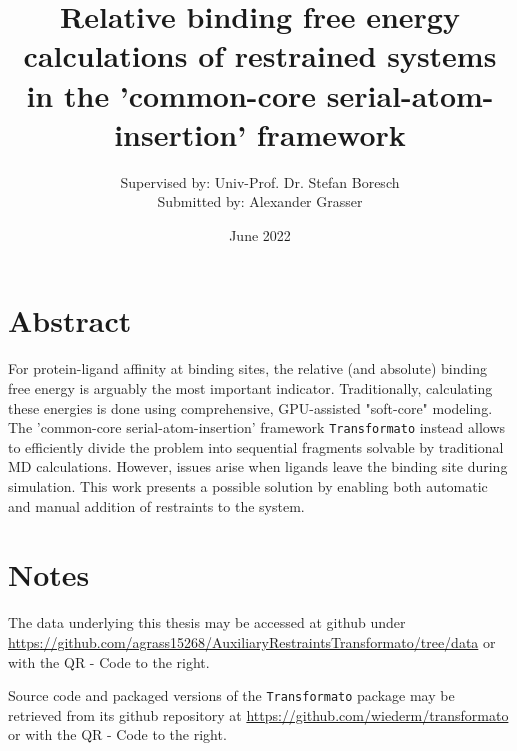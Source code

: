 \documentclass[oneside]{scrreprt}
\title{Relative binding free energy calculations of restrained systems in the 'common-core serial-atom-insertion' framework}
\author{Supervised by: Univ-Prof. Dr. Stefan Boresch\\Submitted by: \hspace{26mm}Alexander Grasser}
\date{June 2022}
\begin{document}
\begin{titlepage}

\maketitle{}
\end{titlepage}
\section*{Abstract}
    
    For protein-ligand affinity at binding sites, the relative (and absolute) binding free energy is arguably the most important indicator. Traditionally, calculating these energies is done using comprehensive, GPU-assisted "soft-core" modeling. The 'common-core serial-atom-insertion' framework \texttt{Transformato} instead allows to efficiently divide the problem into sequential fragments solvable by traditional MD calculations. However, issues arise when ligands leave the binding site during simulation. This work presents a possible solution by enabling both automatic and manual addition of restraints to the system.
\vspace{\fill}
\section*{Notes}
\noindent\begin{minipage}{0.7\textwidth}
The data underlying this thesis may be accessed at github under \url{https://github.com/agrass15268/AuxiliaryRestraintsTransformato/tree/data} or with the QR - Code to the right.
\end{minipage}
\hspace{0.1\textwidth}
\begin{minipage}{0.2\textwidth}

\end{minipage}
 
\vspace{1cm}

\noindent\begin{minipage}{0.7\textwidth}
Source code and packaged versions of the \texttt{Transformato} package may be retrieved from its github repository at  \url{https://github.com/wiederm/transformato} or with the QR - Code to the right.
\end{minipage}
\hspace{0.1\textwidth}
\begin{minipage}{0.2\textwidth}

\end{minipage}
\newpage
\end{document}
